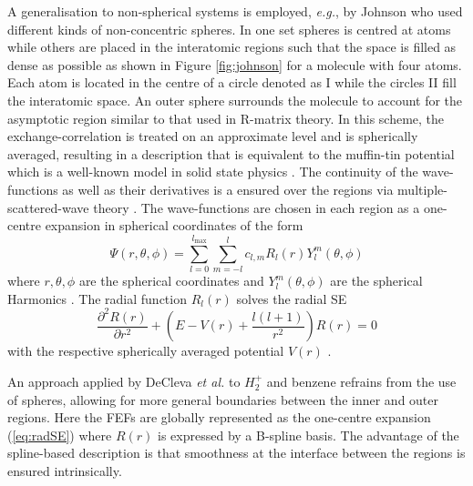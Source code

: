 A generalisation to non-spherical systems is employed, \textit{e.g.}, by Johnson \cite{johnson} who used different kinds of non-concentric spheres.
In one set spheres is centred at atoms while others are placed in the interatomic regions such that the space is filled as dense as possible as shown in Figure \ref{fig:johnson} for a molecule with four atoms.
Each atom is located in the centre of a circle denoted as I while the circles II fill the interatomic space.
An outer sphere surrounds the molecule to account for the asymptotic region similar to that used in R-matrix theory.
In this scheme, the exchange-correlation is treated on an approximate level \cite{slaterJohn} and is spherically averaged, resulting in a description that is equivalent to the muffin-tin potential which is a well-known model in solid state physics \cite{MufTin,MufTin1}.
The continuity of the wave-functions as well as their derivatives is a ensured over the regions via multiple-scattered-wave theory \cite{johnson}.
The wave-functions are chosen in each region as a one-centre expansion in spherical coordinates of the form
\begin{equation} \label{eq:radSE}
\Psi(r, \theta, \phi) =\sum_{l=0}^{l_\text{max}}\sum_{m=-l}^l c_{l,m} R_l(r) Y_l^m(\theta, \phi)
\end{equation}
where $r,\theta,\phi$ are the spherical coordinates and $Y_l^m(\theta,\phi)$ are the spherical Harmonics \cite{Lifschitz}.
The radial function $R_l(r)$ solves the radial SE 
\begin{equation}
\frac{\partial^2 R(r)}{\partial r^2} + \left( E-V(r) + \frac{l(l+1)}{r^2} \right)R(r)=0
\end{equation}
with the respective spherically averaged potential $V(r)$ \cite{johnson}.

An approach applied by DeCleva \textit{et al.} to $H_2^+$ \cite{H2pDeCleva} and benzene \cite{DeClevaBenzene} refrains from the use of spheres, allowing for more general boundaries between the inner and outer regions.
Here the FEFs are globally represented as the one-centre expansion (\ref{eq:radSE}) where $R(r)$ is expressed by a B-spline basis. %
The advantage of the spline-based description is that smoothness at the interface between the regions is ensured intrinsically.

